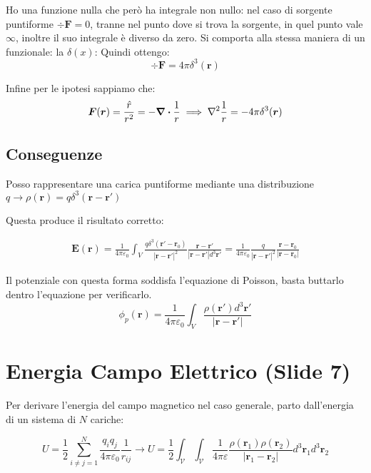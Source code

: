 \documentclass[a4paper]{scrarticle}
\begin{document}
Ho una funzione nulla che però ha integrale non nullo:
nel caso di sorgente puntiforme $\div {\bm F} = 0$, tranne nel punto dove si trova la sorgente, in quel punto vale $\infty$, inoltre il suo integrale è diverso da zero. Si comporta alla stessa maniera di un funzionale: la $\delta(x)$:
Quindi ottengo:
\begin{equation*}
    \div{\bm{F}} = 4\pi \delta^3(\bm r)
\end{equation*}

Infine per le ipotesi sappiamo che:
\begin{equation*}
    \bm F (\bm r) = \frac{\hat r}{r^2} = - \div \frac{1}{r} \implies \laplacian \frac{1}{r} = - 4 \pi \delta ^3 (\bm r)
\end{equation*}

\subsection{Conseguenze}

Posso rappresentare una carica puntiforme mediante una distribuzione $q \to \rho(\bm r) = q\delta^3(\bm r - \bm r')$

Questa produce il risultato corretto:

\begin{gather*}
    \bm E (\bm r) = \frac{1}{4\pi\varepsilon_0}\int_{V} \frac{q \delta^3 (\bm r' - \bm r_0)}{\left|\bm r - \bm r'\right|^2}\frac{\bm r - \bm r'}{\left| \bm r - \bm r '\right| d^3 \bm r'} = \frac{1}{4 \pi \varepsilon_0} \frac{q}{\left|\bm r - \bm r'\right|^2} \frac{\bm r - \bm r_0}{\left|\bm r - \bm r_0\right|}
\end{gather*}

Il potenziale con questa forma soddisfa l'equazione di Poisson, basta buttarlo dentro l'equazione per verificarlo.
\begin{equation}
    \phi_p(\bm r) = \frac{1}{4\pi\varepsilon_0}\int_{V}\frac{\rho(\bm r') d^3\bm r'}{\left|\bm r - \bm r'\right|}
\end{equation}

\section{Energia Campo Elettrico (Slide 7)}

Per derivare l'energia del campo magnetico nel caso generale, parto dall'energia di un sistema di $N$ cariche:

\begin{equation*}
    U = \frac{1}{2} \sum_{i \neq j = 1}^{N} \frac{q_i q_j}{4\pi\varepsilon_0}\frac{1}{r_{ij}} \to U = \frac{1}{2} \int_{\mathcal{V}} \int_{\mathcal{V}} \frac{1}{4\pi\varepsilon}\frac{\rho(\bm r_1)\rho(\bm r_2)}{|\bm r_1 - \bm r_2|} d^3\bm r_1 d^3\bm r_2
\end{equation*}
\end{document}
